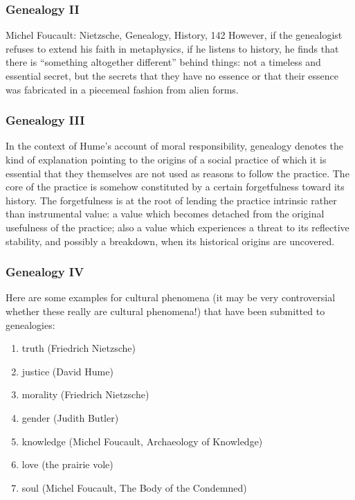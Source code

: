 \documentclass[xcolor=dvipsnames]{beamer}
\begin{document}
\begin{frame}
  \frametitle{Genealogy II}
  \begin{block}{Michel Foucault: Nietzsche, Genealogy, History, 142}
    However, if the genealogist refuses to extend his faith in
    metaphysics, if he listens to history, he finds that there is
    ``something altogether different'' behind things: not a timeless and
    essential secret, but the secrets that they have no essence or
    that their essence was fabricated in a piecemeal fashion from
    alien forms.
  \end{block}
\end{frame}

\begin{frame}
  \frametitle{Genealogy III}
    In the context of Hume's account of moral responsibility,
    genealogy denotes the kind of explanation pointing to the origins
    of a social practice of which it is essential that they themselves
    are not used as reasons to follow the practice. The core of the
    practice is somehow constituted by a certain forgetfulness toward
    its history. The forgetfulness is at the root of lending the
    practice intrinsic rather than instrumental value: a value which
    becomes detached from the original usefulness of the practice;
    also a value which experiences a threat to its reflective
    stability, and possibly a breakdown, when its historical origins
    are uncovered.
\end{frame}

\begin{frame}
  \frametitle{Genealogy IV}
Here are some examples for cultural phenomena (it may be very
controversial whether these really are cultural phenomena!) that have
been submitted to genealogies:
\begin{enumerate}
\item truth (Friedrich Nietzsche)
\item justice (David Hume)
\item morality (Friedrich Nietzsche)
\item gender (Judith Butler)
\item knowledge (Michel Foucault, Archaeology of Knowledge)
\item love (the prairie vole)
\item soul (Michel Foucault, The Body of the Condemned)
\end{enumerate}
\end{frame}
\end{document}
